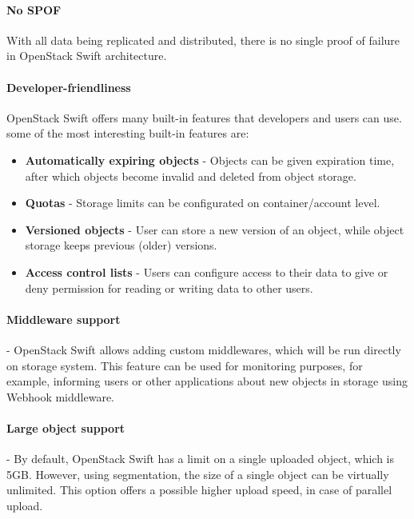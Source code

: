     \paragraph{No SPOF}
    With all data being replicated and distributed, there is no single proof of failure in OpenStack Swift architecture.

    \paragraph{Developer-friendliness}
    OpenStack Swift offers many built-in features that developers and users can use. some of the most interesting built-in features are\cite{swiftOpenStackSwift}:
    \begin{itemize}
        \item \textbf{Automatically expiring objects} - Objects can be given expiration time, after which objects become invalid and deleted from object storage.
        \item \textbf{Quotas} - Storage limits can be configurated on container/account level.
        \item \textbf{Versioned objects} - User can store a new version of an object, while object storage keeps previous (older) versions.
        \item \textbf{Access control lists} - Users can configure access to their data to give or deny permission for reading or writing data to other users.
    \end{itemize}

    \paragraph{Middleware support}
    - OpenStack Swift allows adding custom middlewares, which will be run directly on storage system\cite{swiftEssentials}. This feature can be used for monitoring purposes, for example, informing users or other applications about new objects in storage using Webhook middleware.

    \paragraph{Large object support}
    - By default, OpenStack Swift has a limit on a single uploaded object, which is 5GB. However, using segmentation, the size of a single object can be virtually unlimited. This option offers a possible higher upload speed, in case of parallel upload\cite{swiftLOS}.

